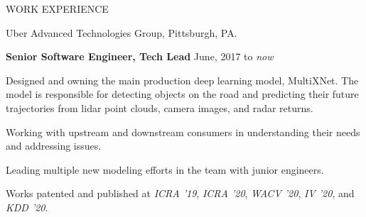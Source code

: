 \documentclass{resume} %
\begin{document}

\begin{rSection}{WORK EXPERIENCE}

\begin{rSubsection}{\hspace{-1em} Uber Advanced Technologies Group, Pittsburgh, PA.}{}{}{}
\vspace{-0.3em}
\item[] \hspace{-2em} {\bf Senior Software Engineer, Tech Lead} \hfill June, 2017 to \emph{now}
\item Designed and owning the main production deep learning model, MultiXNet. The model is responsible for detecting objects on the road and predicting their future trajectories from lidar point clouds, camera images, and radar returns.
\item Working with upstream and downstream consumers in understanding their needs and addressing issues.
\item Leading multiple new modeling efforts in the team with junior engineers.
\item Works patented and published at \emph{ICRA '19}, \emph{ICRA '20}, \emph{WACV '20}, \emph{IV '20}, and \emph{KDD '20}.
\end{rSubsection}
\end{rSection}
\end{document}
